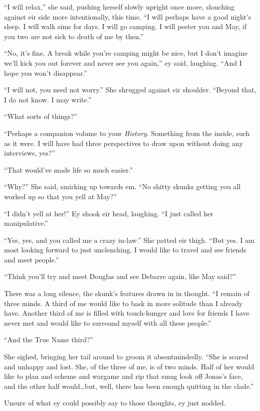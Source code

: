 ``I will relax,'' she said, pushing herself slowly upright once more, slouching against eir side more intentionally, this time. ``I will perhaps have a good night's sleep. I will walk sims for days. I will go camping. I will pester you and May, if you two are not sick to death of me by then.''

``No, it's fine. A break while you're camping might be nice, but I don't imagine we'll kick you out forever and never see you again,'' ey said, laughing. ``And I hope you won't disappear.''

``I will not, you need not worry.'' She shrugged against eir shoulder. ``Beyond that, I do not know. I may write.''

``What sorts of things?''

``Perhaps a companion volume to your \emph{History}. Something from the inside, such as it were. I will have had three perspectives to draw upon without doing any interviews, yes?''

``That would've made life so much easier.''

``Why?'' She said, smirking up towards em. ``No shitty skunks getting you all worked up so that you yell at May?''

``I didn't yell at her!'' Ey shook eir head, laughing. ``I just called her manipulative.''

``Yes, yes, and you called me a crazy in-law.'' She patted eir thigh. ``But yes. I am most looking forward to just unclenching. I would like to travel and see friends and meet people.''

``Think you'll try and meet Douglas and see Debarre again, like May said?''

There was a long silence, the skunk's features drawn in in thought. ``I remain of three minds. A third of me would like to bask in more solitude than I already have. Another third of me is filled with touch-hunger and love for friends I have never met and would like to surround myself with all these people.''

``And the True Name third?''

She sighed, bringing her tail around to groom it absentmindedly. ``She is scared and unhappy and lost. She, of the three of me, is of two minds. Half of her would like to plan and scheme and wargame and rip that smug look off Jonas's face, and the other half would\ldots but, well, there has been enough quitting in the clade.''

Unsure of what ey could possibly say to those thoughts, ey just nodded.

